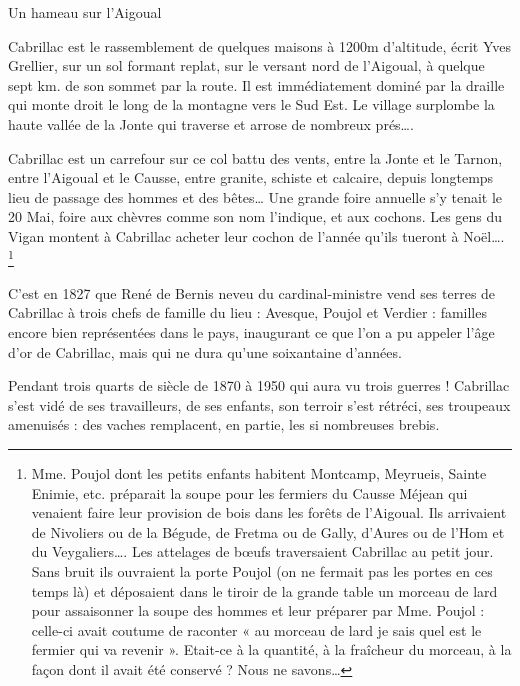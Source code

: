 \begin{center}
    {\large Un hameau sur l’Aigoual}
\end{center}

\vspace{0.45cm}

Cabrillac est le rassemblement de quelques maisons à 1200m d’altitude, écrit Yves Grellier,
sur un sol formant replat, sur le versant nord de l’Aigoual, à quelque sept km. de son sommet
par la route. Il est immédiatement dominé par la draille qui monte droit le long de la
montagne vers le Sud Est. Le village surplombe la haute vallée de la Jonte qui traverse et
arrose de nombreux prés….

\vspace{0.3cm}

Cabrillac est un carrefour sur ce col battu des vents, entre la Jonte et le Tarnon, entre
l’Aigoual et le Causse, entre granite, schiste et calcaire, depuis longtemps lieu de passage des
hommes et des bêtes… Une grande foire annuelle s’y tenait le 20 Mai, foire aux chèvres
comme son nom l’indique, et aux cochons. Les gens du Vigan montent à Cabrillac acheter
leur cochon de l’année qu’ils tueront à Noël…. \footnote{Mme. Poujol dont les petits enfants habitent Montcamp, Meyrueis, Sainte Enimie, etc. préparait la soupe pour les fermiers du Causse Méjean qui venaient faire leur provision de bois dans les forêts de l’Aigoual. Ils arrivaient de Nivoliers ou de la Bégude, de Fretma ou de Gally, d’Aures ou de l’Hom et du Veygaliers…. Les attelages de bœufs traversaient Cabrillac au petit jour. Sans bruit ils ouvraient la porte Poujol (on ne fermait pas les portes en ces temps là) et déposaient dans le tiroir de la grande table un morceau de lard pour assaisonner la soupe des hommes et leur préparer par Mme. Poujol : celle-ci avait coutume de raconter « au morceau de lard je sais quel est le fermier qui va revenir ». Etait-ce à la quantité, à la fraîcheur du morceau, à la façon dont il avait été conservé ? Nous ne savons…}

\vspace{0.3cm}

C’est en 1827 que René de Bernis neveu du cardinal-ministre vend ses terres de Cabrillac à
trois chefs de famille du lieu : Avesque, Poujol et Verdier : familles encore bien représentées
dans le pays, inaugurant ce que l’on a pu appeler l’âge d’or de Cabrillac, mais qui ne dura
qu’une soixantaine d’années.

Pendant trois quarts de siècle de 1870 à 1950 qui aura vu trois guerres ! Cabrillac s’est vidé de
ses travailleurs, de ses enfants, son terroir s’est rétréci, ses troupeaux amenuisés : des vaches
remplacent, en partie, les si nombreuses brebis.


